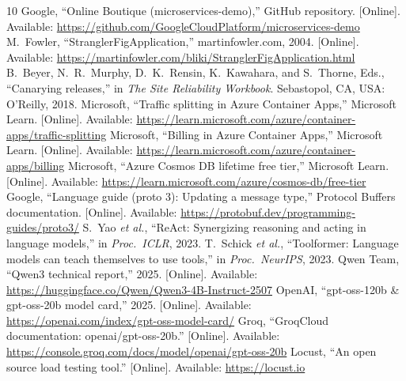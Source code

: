 \documentclass[conference]{IEEEtran}
\begin{document}
\begin{thebibliography}{10}
 Google, ``Online Boutique (microservices-demo),'' GitHub repository. [Online]. Available: \url{https://github.com/GoogleCloudPlatform/microservices-demo}
 M.~Fowler, ``StranglerFigApplication,'' martinfowler.com, 2004. [Online]. Available: \url{https://martinfowler.com/bliki/StranglerFigApplication.html}
 B.~Beyer, N.~R.~Murphy, D.~K.~Rensin, K.~Kawahara, and S.~Thorne, Eds., ``Canarying releases,'' in \emph{The Site Reliability Workbook}. Sebastopol, CA, USA: O'Reilly, 2018.
 Microsoft, ``Traffic splitting in Azure Container Apps,'' Microsoft Learn. [Online]. Available: \url{https://learn.microsoft.com/azure/container-apps/traffic-splitting}
 Microsoft, ``Billing in Azure Container Apps,'' Microsoft Learn. [Online]. Available: \url{https://learn.microsoft.com/azure/container-apps/billing}
 Microsoft, ``Azure Cosmos DB lifetime free tier,'' Microsoft Learn. [Online]. Available: \url{https://learn.microsoft.com/azure/cosmos-db/free-tier}
 Google, ``Language guide (proto 3): Updating a message type,'' Protocol Buffers documentation. [Online]. Available: \url{https://protobuf.dev/programming-guides/proto3/}
 S.~Yao \emph{et al.}, ``ReAct: Synergizing reasoning and acting in language models,'' in \emph{Proc.\ ICLR}, 2023.
 T.~Schick \emph{et al.}, ``Toolformer: Language models can teach themselves to use tools,'' in \emph{Proc.\ NeurIPS}, 2023.
 Qwen Team, ``Qwen3 technical report,'' 2025. [Online]. Available: \url{https://huggingface.co/Qwen/Qwen3-4B-Instruct-2507}
 OpenAI, ``gpt-oss-120b \& gpt-oss-20b model card,'' 2025. [Online]. Available: \url{https://openai.com/index/gpt-oss-model-card/}
 Groq, ``GroqCloud documentation: openai/gpt-oss-20b.'' [Online]. Available: \url{https://console.groq.com/docs/model/openai/gpt-oss-20b}
 Locust, ``An open source load testing tool.'' [Online]. Available: \url{https://locust.io}
\end{thebibliography}
\end{document}
